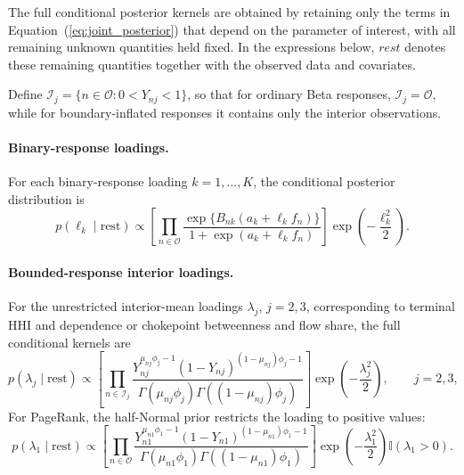 \documentclass[pdftex,12pt,openright,a4paper,oneside]{book}
\begin{document}
The full conditional posterior kernels are obtained by retaining
only the terms in Equation~(\ref{eq:joint_posterior}) that depend
on the parameter of interest, with all remaining
unknown quantities held fixed. In the expressions below,
$\textit{rest}$ denotes these remaining quantities together
with the observed data and covariates.

Define
$\mathcal{I}_j=\{n\in\mathcal{O}:0<Y_{nj}<1\}$, so that 
for ordinary Beta responses, $\mathcal{I}_j=\mathcal{O}$, while
for boundary-inflated responses it contains only the
interior observations.

\paragraph{Binary-response loadings.}

For each binary-response loading $k=1,\ldots,K$, the
conditional posterior distribution is
\begin{equation}
p(\ell_k\mid\mathrm{rest})
\propto
\left[
\prod_{n\in\mathcal{O}}
\frac{\exp\{B_{nk}(a_k+\ell_k f_n)\}}
{1+\exp(a_k+\ell_k f_n)}
\right]
\exp\left(-\frac{\ell_k^2}{2}\right).
\label{eq:fc_binary_loading}
\end{equation}

\paragraph{Bounded-response interior loadings.}

For the unrestricted interior-mean loadings
$\lambda_j$, $j=2,3$, corresponding to terminal HHI
and dependence or chokepoint betweenness and flow share,
the full conditional kernels are
\begin{equation}
p(\lambda_j\mid\mathrm{rest})
\propto
\left[
\prod_{n\in\mathcal{I}_j}
\frac{
Y_{nj}^{\mu_{nj}\phi_j-1}
(1-Y_{nj})^{(1-\mu_{nj})\phi_j-1}
}{
\Gamma(\mu_{nj}\phi_j)
\Gamma((1-\mu_{nj})\phi_j)
}
\right]
\exp\left(-\frac{\lambda_j^2}{2}\right),
\qquad j=2,3,
\label{eq:fc_beta_loading}
\end{equation}
For PageRank, the half-Normal prior restricts the
loading to positive values:
\begin{equation}
p(\lambda_1\mid\mathrm{rest})
\propto
\left[
\prod_{n\in\mathcal{O}}
\frac{
Y_{n1}^{\mu_{n1}\phi_1-1}
(1-Y_{n1})^{(1-\mu_{n1})\phi_1-1}
}{
\Gamma(\mu_{n1}\phi_1)
\Gamma((1-\mu_{n1})\phi_1)
}
\right]
\exp\left(-\frac{\lambda_1^2}{2}\right)
\mathbb{I}(\lambda_1>0).
\label{eq:fc_pagerank_loading}
\end{equation}
\end{document}
